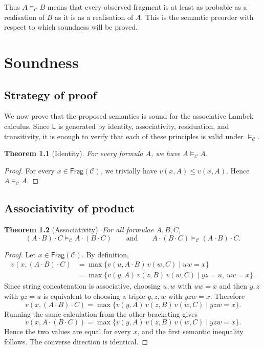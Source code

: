 \documentclass[12pt,a4paper]{report}
\newtheorem{theorem}{Theorem}[chapter]
\theoremstyle{definition}
\newcommand{\LC}{\mathsf{L}}
\newcommand{\Frag}{\mathsf{Frag}}
\newcommand{\Sem}{\models_{\mathcal C}}
\newcommand{\concat}{\mathbin{\cdot}}
\begin{document}
Thus $A \Sem B$ means that every observed fragment is at least as probable as a realisation of
$B$ as it is as a realisation of $A$. This is the semantic preorder with respect to which soundness
will be proved.

\chapter{Soundness}

\section{Strategy of proof}
We now prove that the proposed semantics is sound for the associative Lambek calculus. Since
$\LC$ is generated by identity, associativity, residuation, and transitivity, it is enough to verify
that each of these principles is valid under $\Sem$.

\begin{theorem}[Identity]
For every formula $A$, we have $A \Sem A$.
\end{theorem}

\begin{proof}
For every $x \in \Frag(\mathcal C)$, we trivially have $v(x,A) \leq v(x,A)$. Hence $A \Sem A$.
\end{proof}

\section{Associativity of product}
\begin{theorem}[Associativity]
For all formulae $A,B,C$,
\[
(A\concat B)\concat C \Sem A\concat(B\concat C)
\qquad\text{and}\qquad
A\concat(B\concat C) \Sem (A\concat B)\concat C.
\]
\end{theorem}

\begin{proof}
Let $x \in \Frag(\mathcal C)$. By definition,
\begin{align*}
v(x,(A\concat B)\concat C)
&= \max\{v(u,A\concat B)\,v(w,C) \mid uw=x\} \\
&= \max\{v(y,A)\,v(z,B)\,v(w,C) \mid yz=u,\ uw=x\}.
\end{align*}
Since string concatenation is associative, choosing $u,w$ with $uw=x$ and then $y,z$ with
$yz=u$ is equivalent to choosing a triple $y,z,w$ with $yzw=x$. Therefore
\[
v(x,(A\concat B)\concat C)
= \max\{v(y,A)\,v(z,B)\,v(w,C) \mid yzw=x\}.
\]
Running the same calculation from the other bracketing gives
\[
v(x,A\concat(B\concat C))
= \max\{v(y,A)\,v(z,B)\,v(w,C) \mid yzw=x\}.
\]
Hence the two values are equal for every $x$, and the first semantic inequality follows.
The converse direction is identical.
\end{proof}
\end{document}
